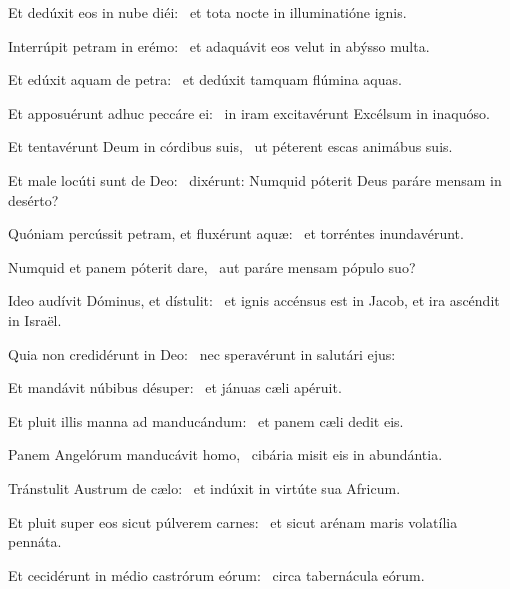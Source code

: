 \item Et dedúxit eos in nube diéi:~\psstar{} et tota nocte in illuminatióne ignis.

\item Interrúpit petram in erémo:~\psstar{} et adaquávit eos velut in abýsso multa.

\item Et edúxit aquam de petra:~\psstar{} et dedúxit tamquam flúmina aquas.

\item Et apposuérunt adhuc peccáre ei:~\psstar{} in iram excitavérunt Excélsum in inaquóso.

\item Et tentavérunt Deum in córdibus suis,~\psstar{} ut péterent escas animábus suis.

\item Et male locúti sunt de Deo:~\psstar{} dixérunt: Numquid póterit Deus paráre mensam in desérto?

\item Quóniam percússit petram, et fluxérunt aquæ:~\psstar{} et torréntes inundavérunt.

\item Numquid et panem póterit dare,~\psstar{} aut paráre mensam pópulo suo?

\item Ideo audívit Dóminus, et dístulit:~\psstar{} et ignis accénsus est in Jacob, et ira ascéndit in Israël.

\item Quia non credidérunt in Deo:~\psstar{} nec speravérunt in salutári ejus:

\item Et mandávit núbibus désuper:~\psstar{} et jánuas cæli apéruit.

\item Et pluit illis manna ad manducándum:~\psstar{} et panem cæli dedit eis.

\item Panem Angelórum manducávit homo,~\psstar{} cibária misit eis in abundántia.

\item Tránstulit Austrum de cælo:~\psstar{} et indúxit in virtúte sua Africum.

\item Et pluit super eos sicut púlverem carnes:~\psstar{} et sicut arénam maris volatília pennáta.

\item Et cecidérunt in médio castrórum eórum:~\psstar{} circa tabernácula eórum.


